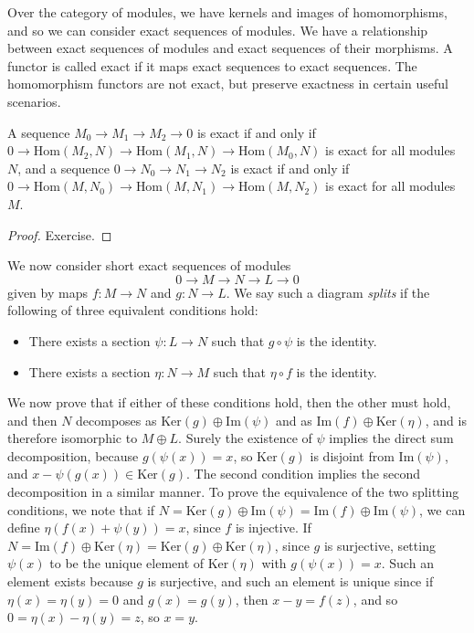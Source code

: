 Over the category of modules, we have kernels and images of homomorphisms, and so we can consider exact sequences of modules. We have a relationship between exact sequences of modules and exact sequences of their morphisms. A functor is called exact if it maps exact sequences to exact sequences. The homomorphism functors are not exact, but preserve exactness in certain useful scenarios.

\begin{theorem}
    A sequence $M_0 \to M_1 \to M_2 \to 0$ is exact if and only if $0 \to \text{Hom}(M_2,N) \to \text{Hom}(M_1,N) \to \text{Hom}(M_0,N)$ is exact for all modules $N$, and a sequence $0 \to N_0 \to N_1 \to N_2$ is exact if and only if $0 \to \text{Hom}(M,N_0) \to \text{Hom}(M,N_1) \to \text{Hom}(M,N_2)$ is exact for all modules $M$.
\end{theorem}
\begin{proof}
    Exercise.
\end{proof}

We now consider short exact sequences of modules
%
\[ 0 \to M \to N \to L \to 0 \]
%
given by maps $f: M \to N$ and $g: N \to L$. We say such a diagram \emph{splits} if the following of three equivalent conditions hold:
%
\begin{itemize}
    \item There exists a section $\psi: L \to N$ such that $g \circ \psi$ is the identity.

    \item There exists a section $\eta: N \to M$ such that $\eta \circ f$ is the identity.
\end{itemize}
%
We now prove that if either of these conditions hold, then the other must hold, and then $N$ decomposes as $\text{Ker}(g) \oplus \text{Im}(\psi)$ and as $\text{Im}(f) \oplus \text{Ker}(\eta)$, and is therefore isomorphic to $M \oplus L$. Surely the existence of $\psi$ implies the direct sum decomposition, because $g(\psi(x)) = x$, so $\text{Ker}(g)$ is disjoint from $\text{Im}(\psi)$, and $x - \psi(g(x)) \in \text{Ker}(g)$. The second condition implies the second decomposition in a similar manner. To prove the equivalence of the two splitting conditions, we note that if $N = \text{Ker}(g) \oplus \text{Im}(\psi) = \text{Im}(f) \oplus \text{Im}(\psi)$, we can define $\eta(f(x) + \psi(y)) = x$, since $f$ is injective. If $N = \text{Im}(f) \oplus \text{Ker}(\eta) = \text{Ker}(g) \oplus \text{Ker}(\eta)$, since $g$ is surjective, setting $\psi(x)$ to be the unique element of $\text{Ker}(\eta)$ with $g(\psi(x)) = x$. Such an element exists because $g$ is surjective, and such an element is unique since if $\eta(x) = \eta(y) = 0$ and $g(x) = g(y)$, then $x - y = f(z)$, and so $0 = \eta(x) - \eta(y) = z$, so $x = y$.

